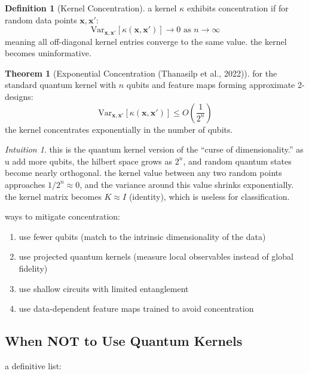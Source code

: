 \documentclass[11pt,a4paper]{article}
\theoremstyle{definition}
\newtheorem{definition}{Definition}[section]
\newtheorem{theorem}{Theorem}[section]
\theoremstyle{remark}
\newtheorem*{intuition}{Intuition}
\begin{document}
\begin{definition}[Kernel Concentration]
a kernel $\kappa$ exhibits concentration if for random data points $\mathbf{x}, \mathbf{x}'$:
\[
\text{Var}_{\mathbf{x}, \mathbf{x}'}[\kappa(\mathbf{x}, \mathbf{x}')] \to 0 \text{ as } n \to \infty
\]
meaning all off-diagonal kernel entries converge to the same value. the kernel becomes uninformative.
\end{definition}

\begin{theorem}[Exponential Concentration (Thanasilp et al., 2022)]
for the standard quantum kernel with $n$ qubits and feature maps forming approximate 2-designs:
\[
\text{Var}_{\mathbf{x}, \mathbf{x}'}[\kappa(\mathbf{x}, \mathbf{x}')] \leq O\!\left(\frac{1}{2^n}\right)
\]
the kernel concentrates exponentially in the number of qubits.
\end{theorem}

\begin{intuition}
this is the quantum kernel version of the ``curse of dimensionality.'' as u add more qubits, the hilbert space grows as $2^n$, and random quantum states become nearly orthogonal. the kernel value between any two random points approaches $1/2^n \approx 0$, and the variance around this value shrinks exponentially. the kernel matrix becomes $K \approx I$ (identity), which is useless for classification.
\end{intuition}

ways to mitigate concentration:
\begin{enumerate}[leftmargin=*]
    \item use fewer qubits (match to the intrinsic dimensionality of the data)
    \item use projected quantum kernels (measure local observables instead of global fidelity)
    \item use shallow circuits with limited entanglement
    \item use data-dependent feature maps trained to avoid concentration
\end{enumerate}

\subsection{When NOT to Use Quantum Kernels}

a definitive list:
\end{document}
